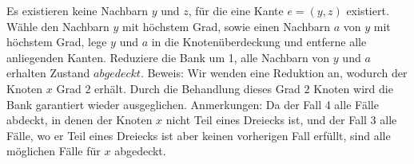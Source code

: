 \documentclass[12pt,onecolumn, notitlepage]{scrartcl}
\begin{document}
Es existieren keine Nachbarn $y$ und $z$, für die eine Kante $e = (y,z)$ existiert. Wähle den Nachbarn $y$ mit höchstem Grad, sowie einen Nachbarn $a$ von $y$ mit höchstem Grad, lege $y$ und $a$ in die Knotenüberdeckung und entferne alle anliegenden Kanten. Reduziere die Bank um 1, alle Nachbarn von $y$ und $a$ erhalten Zustand $abgedeckt$. \newline
Beweis: Wir wenden eine Reduktion an, wodurch der Knoten $x$ Grad $2$ erhält. Durch die Behandlung dieses Grad $2$ Knoten wird die Bank garantiert wieder ausgeglichen. \newline\newline
Anmerkungen:\newline
Da der Fall 4 alle Fälle abdeckt, in denen der Knoten $x$ nicht Teil eines Dreiecks ist, und der Fall 3 alle Fälle, wo er Teil eines Dreiecks ist aber keinen vorherigen Fall erfüllt, sind alle möglichen Fälle für $x$ abgedeckt.
\end{document}
